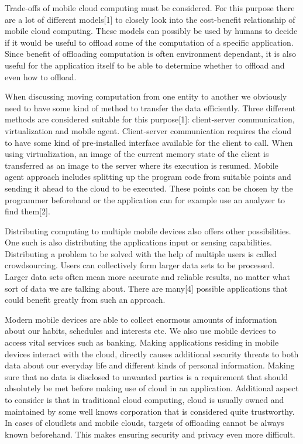 \documentclass[conference]{IEEEtran}
\begin{document}
\par
Trade-offs of mobile cloud computing must be considered. For this purpose there are a lot of different models[1] to closely look into the cost-benefit relationship of mobile cloud computing. These models can possibly be used by humans to decide if it would be useful to offload some of the computation of a specific application. Since benefit of offloading computation is often environment dependant, it is also useful for the application itself to be able to determine whether to offload and even how to offload.
\par
When discussing moving computation from one entity to another we obviously need to have some kind of method to transfer the data efficiently. Three different methods are considered suitable for this purpose[1]: client-server communication, virtualization and mobile agent. Client-server communication requires the cloud to have some kind of pre-installed interface available for the client to call. When using virtualization, an image of the current memory state of the client is transferred as an image to the server where its execution is resumed. Mobile agent approach includes splitting up the program code from suitable points and sending it ahead to the cloud to be executed. These points can be chosen by the programmer beforehand or the application can for example use an analyzer to find them[2].
\par
Distributing computing to multiple mobile devices also offers other possibilities. One such is also distributing the applications input or sensing capabilities. Distributing a problem to be solved with the help of multiple users is called crowdsourcing. Users can collectively form larger data sets to be processed. Larger data sets often mean more accurate and reliable results, no matter what sort of data we are talking about. There are many[4] possible applications that could benefit greatly from such an approach.
\par
Modern mobile devices are able to collect enormous amounts of information about our habits, schedules and interests etc. We also use mobile devices to access vital services such as banking. Making applications residing in mobile devices interact with the cloud, directly causes additional security threats to both data about our everyday life and different kinds of personal information. Making sure that no data is disclosed to unwanted parties is a requirement that should absolutely be met before making use of cloud in an application. Additional aspect to consider is that in traditional cloud computing, cloud is usually owned and maintained by some well knows corporation that is considered quite trustworthy. In cases of cloudlets and mobile clouds, targets of offloading cannot be always known beforehand. This makes ensuring security and privacy even more difficult.
\end{document}
